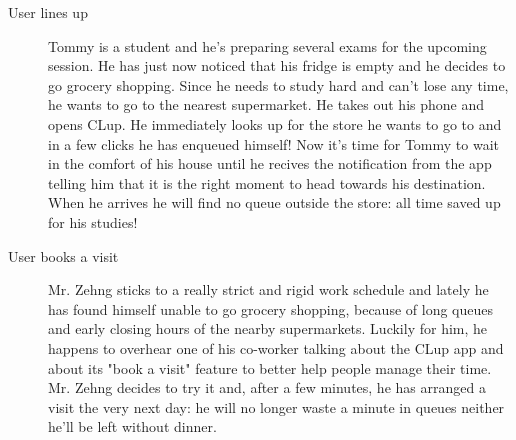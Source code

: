 \begin{description}
    \item[User lines up] 
    Tommy is a student and he’s preparing several exams for the upcoming session.
    He has just now noticed that his fridge is empty and he decides to go grocery shopping. Since he needs to study hard and can't lose any time, he wants to go to the nearest supermarket. He takes out his phone and opens CLup. He immediately looks up for the store he wants to go to and in a few clicks he has enqueued himself! 
    Now it's time for Tommy to wait in the comfort of his house until he recives the notification from the app telling him that it is the right moment to head towards his destination. When he arrives he will find no queue outside the store: all time saved up for his studies!

    \item[User books a visit]
    Mr. Zehng  sticks to a really strict and rigid work schedule and lately he has found himself unable to go grocery shopping, because of long queues and early closing hours of the nearby supermarkets. Luckily for him, he happens to overhear one of his co-worker talking about the CLup app and about its "book a visit" feature to better help people manage their time. Mr. Zehng decides to try it and, after a few minutes, he has arranged a visit the very next day: he will no longer waste a minute in queues neither he'll be left without dinner.


\end{description}
